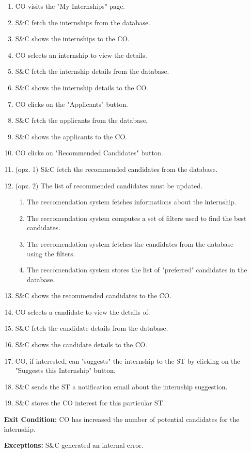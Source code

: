 \begin{enumerate}
    \item CO visits the "My Internships" page.
    \item S\&C fetch the internships from the database.
    \item S\&C shows the internships to the CO.
    \item CO selects an internship to view the details.
    \item S\&C fetch the internship details from the database.
    \item S\&C shows the internship details to the CO.
    \item CO clicks on the "Applicants" button.
    \item S\&C fetch the applicants from the database.
    \item S\&C shows the applicants to the CO.
    \item CO clicks on "Recommended Candidates" button.
    \item (opz. 1) S\&C fetch the recommended candidates from the database.
    \item (opz. 2) The list of recommended candidates must be updated.
    \begin{enumerate}
        \item The reccomendation system fetches informations about the internship.
        \item The reccomendation system computes a set of filters used to find the best candidates.
        \item The reccomendation system fetches the candidates from the database using the filters.
        \item The reccomendation system stores the list of "preferred" candidates in the database.
    \end{enumerate}
    \item S\&C shows the recommended candidates to the CO.
    \item CO selects a candidate to view the details of.
    \item S\&C fetch the candidate details from the database.
    \item S\&C shows the candidate details to the CO.
    \item CO, if interested, can "suggests" the internship to the ST by clicking on the "Suggests this Internship" button.
    \item S\&C sends the ST a notification email about the internship suggestion.
    \item S\&C stores the CO interest for this particular ST.
\end{enumerate}

\par \textbf{Exit Condition:} CO has increased the number of potential candidates for the internship.

\par \textbf{Exceptions:}  S\&C generated an internal error.